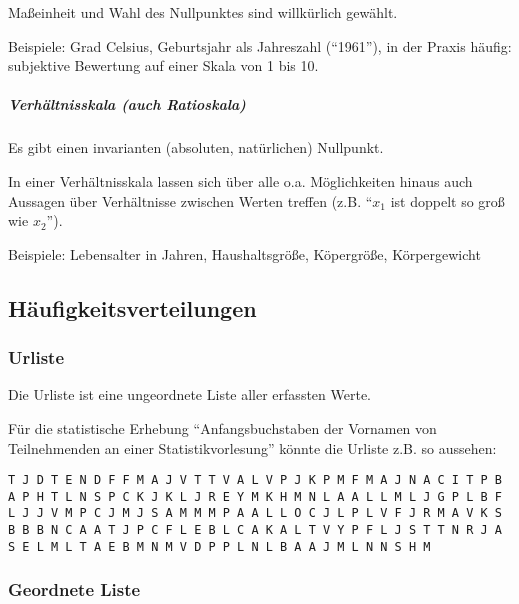 \documentclass[
  ngerman,
]{article}
\begin{document}
Maßeinheit und Wahl des Nullpunktes sind willkürlich gewählt.

Beispiele: Grad Celsius, Geburtsjahr als Jahreszahl (``1961''), in der Praxis häufig: subjektive Bewertung auf einer Skala von 1 bis 10.

\hypertarget{verhuxe4ltnisskala-auch-ratioskala}{%
\subparagraph{Verhältnisskala (auch Ratioskala)}\label{verhuxe4ltnisskala-auch-ratioskala}}

Es gibt einen invarianten (absoluten, natürlichen) Nullpunkt.

In einer Verhältnisskala lassen sich über alle o.a. Möglichkeiten hinaus auch Aussagen über Verhältnisse zwischen Werten treffen (z.B. ``\(x_1\) ist doppelt so groß wie \(x_2\)'').

Beispiele: Lebensalter in Jahren, Haushaltsgröße, Köpergröße,
Körpergewicht

\hypertarget{huxe4ufigkeitsverteilungen}{%
\subsection{Häufigkeitsverteilungen}\label{huxe4ufigkeitsverteilungen}}

\hypertarget{urliste}{%
\subsubsection{Urliste}\label{urliste}}

Die Urliste ist eine ungeordnete Liste aller erfassten Werte.

Für die statistische Erhebung ``Anfangsbuchstaben der Vornamen von Teilnehmenden an einer Statistikvorlesung'' könnte die Urliste z.B. so aussehen:

\texttt{T\ J\ D\ T\ E\ N\ D\ F\ F\ M\ A\ J\ V\ T\ T\ V\ A\ L\ V\ P\ J\ K\ P\ M\ F\ M\ A\ J\ N\ A\ C\ I\ T\ P\ B\ A\ P\ H\ T\ L\ N\ S\ P\ C\ K\ J\ K\ L\ J\ R\ E\ Y\ M\ K\ H\ M\ N\ L\ A\ A\ L\ L\ M\ L\ J\ G\ P\ L\ B\ F\ L\ J\ J\ V\ M\ P\ C\ J\ M\ J\ S\ A\ M\ M\ M\ P\ A\ A\ L\ L\ O\ C\ J\ L\ P\ L\ V\ F\ J\ R\ M\ A\ V\ K\ S\ B\ B\ B\ N\ C\ A\ A\ T\ J\ P\ C\ F\ L\ E\ B\ L\ C\ A\ K\ A\ L\ T\ V\ Y\ P\ F\ L\ J\ S\ T\ T\ N\ R\ J\ A\ S\ E\ L\ M\ L\ T\ A\ E\ B\ M\ N\ M\ V\ D\ P\ P\ L\ N\ L\ B\ A\ A\ J\ M\ L\ N\ N\ S\ H\ M}

\hypertarget{geordnete-liste}{%
\subsubsection{Geordnete Liste}\label{geordnete-liste}}
\end{document}
